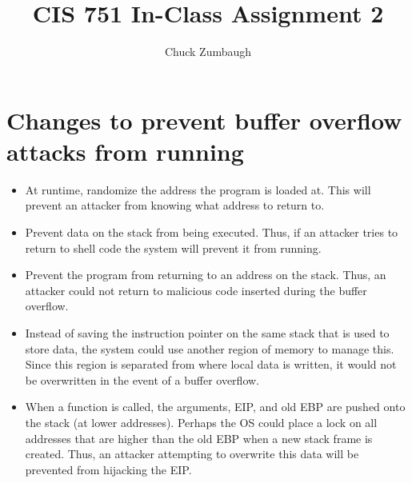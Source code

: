 \documentclass[12pt letterpaper]{article}
\title{CIS 751 In-Class Assignment 2}
\author{Chuck Zumbaugh}
\begin{document}
\maketitle

\section{Changes to prevent buffer overflow attacks from running}
\begin{itemize}
\item At runtime, randomize the address the program is loaded at. This will prevent an attacker from knowing what address to return to.
\item Prevent data on the stack from being executed. Thus, if an attacker tries to return to shell code the system will prevent it from running.
\item Prevent the program from returning to an address on the stack. Thus, an attacker could not return to malicious code inserted during the buffer overflow.
\item Instead of saving the instruction pointer on the same stack that is used to store data, the system could use another region of memory to manage this. Since this region is separated from where local data is written, it would not be overwritten in the event of a buffer overflow.
\item When a function is called, the arguments, EIP, and old EBP are pushed onto the stack (at lower addresses). Perhaps the OS could place a lock on all addresses that are higher than the old EBP when a new stack frame is created. Thus, an attacker attempting to overwrite this data will be prevented from hijacking the EIP.
\end{itemize}
\end{document}
